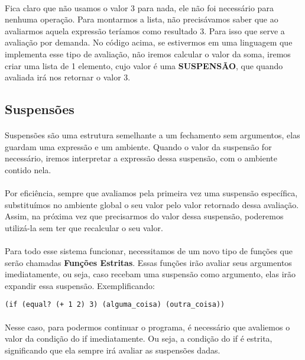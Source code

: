 \documentclass[11pt]{article}
\begin{document}
\paragraph{} Fica claro que não usamos o valor 3 para nada, ele não foi necessário para nenhuma operação. Para montarmos a lista, não precisávamos saber
que ao avaliarmos aquela expressão teríamos como resultado 3. Para isso que serve a avaliação por demanda. No código acima, se estivermos
em uma linguagem que implementa esse tipo de avaliação, não iremos calcular o valor da soma, iremos criar uma lista de 1 elemento, cujo
valor é uma \textbf{SUSPENSÃO}, que quando avaliada irá nos retornar o valor 3.

\subsection{Suspensões}
\label{sec:org4f2e1d0}
\paragraph{} Suspensões são uma estrutura semelhante a um fechamento sem argumentos, elas guardam uma expressão e um ambiente. Quando o
valor da suspensão for necessário, iremos interpretar a expressão dessa suspensão, com o ambiente contido nela.

\paragraph{} Por eficiência, sempre que avaliamos pela primeira vez uma suspensão específica, substituímos no ambiente global o seu valor
pelo valor retornado dessa avaliação. Assim, na próxima vez que precisarmos do valor dessa suspensão, poderemos utilizá-la sem ter que
recalcular o seu valor.

\paragraph{} Para todo esse sistema funcionar, necessitamos de um novo tipo de funções que serão chamadas \textbf{Funções Estritas}. Essas funções
irão avaliar seus argumentos imediatamente, ou seja, caso recebam uma suspensão como argumento, elas irão expandir essa suspensão.
Exemplificando:

\begin{verbatim}
(if (equal? (+ 1 2) 3) (alguma_coisa) (outra_coisa))
\end{verbatim}

\paragraph{} Nesse caso, para podermos continuar o programa, é necessário que avaliemos o valor da condição do if imediatamente. Ou seja,
a condição do if é estrita, significando que ela sempre irá avaliar as suspensões dadas.
\end{document}
